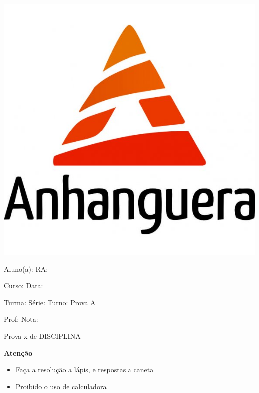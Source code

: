 \documentclass[a4paper]{article}
\begin{document}
\noindent\parbox[c]{.15\textwidth}{\includegraphics[width=.15\textwidth]{logo}}\hfill
\parbox[c]{.825\textwidth}{\raggedright%
{Aluno(a): \underline{\hspace{8.5cm}} RA: \underline{\hspace{2.3cm}}\par}
{Curso: \underline{\hspace{8.95cm}} Data: \underline{\hspace{2cm}}\par}
{Turma: \underline{\hspace{2cm}} Série: \underline{\hspace{2cm}}
  Turno: \underline{\hspace{2.5cm}} Prova A\par}
{Prof: \underline{\hspace{9.15cm}} Nota: \underline{\hspace{2cm}}\par}

\vspace{10pt}
}

{\large Prova x de DISCIPLINA}

\vspace{10pt}


\hrulefill

{\bf Atenção}

\begin{itemize}
\item Faça a resolução a lápis, e respostas a caneta
\item Proibido o uso de calculadora
\end{itemize}
\end{document}
